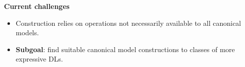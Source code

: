 \documentclass[12pt]{beamer}
\begin{document}
\begin{frame}
\begin{columns}
\begin{column}{0.55\textwidth}
{    \textbf{Current challenges}
    \vspace{-0.7em}
    \begin{itemize}
        \item Construction relies on operations not necessarily available to all canonical models.
        \item \textbf{Subgoal}: find suitable canonical model constructions to classes of more expressive DLs.
    \end{itemize}
}
    
\end{column}
\end{columns}
\end{frame}
\end{document}
